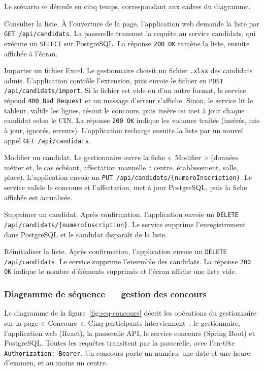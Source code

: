 \begin{onehalfspace}
Le scénario se déroule en cinq temps, correspondant aux cadres du diagramme.

Consulter la liste. À l'ouverture de la page, l'application web demande la liste par \texttt{GET /api/candidats}. La passerelle transmet la requête au service candidats, qui exécute un \texttt{SELECT} sur PostgreSQL. La réponse \texttt{200 OK} ramène la liste, ensuite affichée à l'écran.

Importer un fichier Excel. Le gestionnaire choisit un fichier \texttt{.xlsx} des candidats admis. L'application contrôle l'extension, puis envoie le fichier en \texttt{POST /api/candidats/import}. Si le fichier est vide ou d'un autre format, le service répond \texttt{400 Bad Request} et un message d'erreur s'affiche. Sinon, le service lit le tableur, valide les lignes, résout le concours, puis insère ou met à jour chaque candidat selon le CIN. La réponse \texttt{200 OK} indique les volumes traités (insérés, mis à jour, ignorés, erreurs). L'application recharge ensuite la liste par un nouvel appel \texttt{GET /api/candidats}.

Modifier un candidat. Le gestionnaire ouvre la fiche «~Modifier~» (données métier et, le cas échéant, affectation manuelle~: centre, établissement, salle, place). L'application envoie un \texttt{PUT /api/candidats/\{numeroInscription\}}. Le service valide le concours et l'affectation, met à jour PostgreSQL, puis la fiche affichée est actualisée.

Supprimer un candidat. Après confirmation, l'application envoie un \texttt{DELETE /api/candidats/\{numeroInscription\}}. Le service supprime l'enregistrement dans PostgreSQL et le candidat disparaît de la liste.

Réinitialiser la liste. Après confirmation, l'application envoie un \texttt{DELETE /api/candidats}. Le service supprime l'ensemble des candidats. La réponse \texttt{200 OK} indique le nombre d'éléments supprimés et l'écran affiche une liste vide.

\subsubsection{Diagramme de séquence --- gestion des concours}

Le diagramme de la figure~\ref{fig:seq-concours} décrit les opérations du gestionnaire sur la page «~Concours~». Cinq participants interviennent~: le gestionnaire, l'application web (React), la passerelle API, le service concours (Spring Boot) et PostgreSQL. Toutes les requêtes transitent par la passerelle, avec l'en-tête \texttt{Authorization: Bearer}. Un concours porte un numéro, une date et une heure d'examen, et au moins un centre.


\end{onehalfspace}
